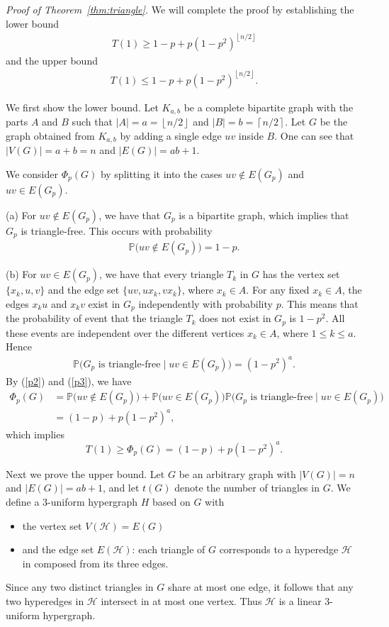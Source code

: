 \documentclass[11pt,a4paper]{article}
\newcommand{\cH}{\mathcal{H}}
\begin{document}
\noindent \emph{Proof of Theorem~\ref{thm:triangle}.} 
We will complete the proof  by establishing the lower bound  
\begin{align*}
T(1)\ge1-p+p(1-p^2)^{\left\lfloor n/2\right\rfloor}
\end{align*}
 and the upper bound 
 \begin{align*}
 T(1)\le1-p+p(1-p^2)^{\left\lfloor n/2\right\rfloor}.
 \end{align*} 

We first show the lower bound. Let $K_{a,b}$ be a complete bipartite graph with the parts $A$ and $B$ such that $|A|=a=\left\lfloor n/2\right\rfloor$ and $|B|=b=\left\lceil n/2\right\rceil$. Let $G$ be the graph obtained from $K_{a,b}$ by adding a single edge $uv$ inside $B$. One can see that $|V(G)|=a+b=n$ and $|E(G)|=ab+1$.

We consider $\Phi_p(G)$ by splitting it into the cases $uv\notin E(G_p)$ and $uv\in E(G_p)$.

(a) For $uv\notin E(G_p)$,  we have that
$G_p$ is a bipartite graph, which implies that  $G_p$ is triangle-free. This occurs with probability
\begin{align}\label{p2}
\mathbb P\bigl(uv\notin E(G_p)\bigr)=1-p.
\end{align}

(b) For $uv\in E(G_p)$, we have that every triangle $T_k$ in $G$ has the vertex set $\{x_k,u,v\}$ and the edge set $\{uv,ux_k,vx_k\}$, where $x_k\in A$.
For any fixed $x_k\in A$, the edges $x_ku$ and $x_kv$ exist in $G_p$ independently with probability $p$. This means  that the probability of event that the triangle $T_k$ does not exist in $G_p$ is $1-p^2$. All these events are independent over the different vertices $x_k\in A$, where $1\le k\le a$. Hence
\begin{align}\label{p3}
\mathbb P\bigl(G_p \text{ is triangle-free}\mid uv\in E(G_p)\bigr)=(1-p^2)^a.
\end{align}
By (\ref{p2}) and (\ref{p3}), we have
\begin{align*}
\Phi_p(G)&=\mathbb P\bigl(uv\notin E(G_p)\bigr)+\mathbb P\bigl(uv\in E(G_p)\bigr)\mathbb P\bigl(G_p \text{ is triangle-free}\mid uv\in E(G_p)\bigr)\\
&=(1-p)+p(1-p^2)^a,
\end{align*}
which implies
$$
T(1)\ge \Phi_p(G)=(1-p)+p(1-p^2)^a.
$$

Next we prove the upper bound.
Let $G$ be an arbitrary graph with $|V(G)|=n$ and $|E(G)|=ab+1$, and let $t(G)$ denote the number of triangles in $G$.
We define a $3$-uniform hypergraph $ H$ based  on $G$ with 
\begin{itemize}
\item the vertex set $V(\cH)=E(G)$ 
\item and the edge set $E(\cH)$: each triangle of $G$ corresponds to a hyperedge  $\cH$ in composed from its three edges.
\end{itemize}
Since any two distinct triangles in $G$ share at most one edge,  
it follows that any two hyperedges in $\cH$ intersect in at most one vertex. Thus $\cH$ is  a linear $3$-uniform hypergraph.
\end{document}
